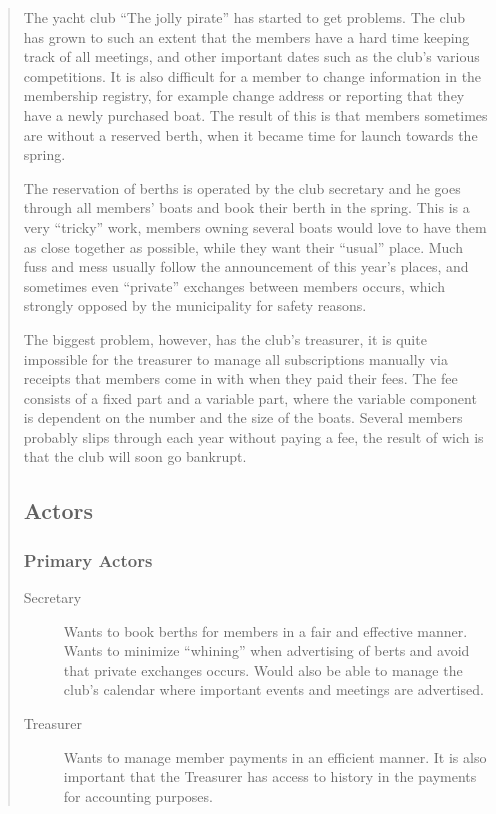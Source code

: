 \begin{quote}
The yacht club ``The jolly pirate'' has started to get problems. The club has
grown to such an extent that the members have a hard time keeping track of all
meetings, and other important dates such as the club's various competitions. It
is also difficult for a member to change information in the membership
registry, for example change address or reporting that they have a newly
purchased boat. The result of this is that members sometimes are without a
reserved berth, when it became time for launch towards the spring.

The reservation of berths is operated by the club secretary and he goes through
all members’ boats and book their berth in the spring. This is a very ``tricky''
work, members owning several boats would love to have them as close together as
possible, while they want their ``usual'' place. Much fuss and mess usually
follow the announcement of this year’s places, and sometimes even ``private''
exchanges between members occurs, which strongly opposed by the municipality
for safety reasons.

The biggest problem, however, has the club’s treasurer, it is quite impossible
for the treasurer to manage all subscriptions manually via receipts that
members come in with when they paid their fees. The fee consists of a fixed
part and a variable part, where the variable component is dependent on the
number and the size of the boats. Several members probably slips through each
year without paying a fee, the result of wich is that the club will soon go
bankrupt.


\subsection{Actors}
\subsubsection{Primary Actors}
\begin{description}
  \item[Secretary]
  Wants to book berths for members in a fair and effective manner. Wants to
  minimize ``whining'' when advertising of berts and avoid that private
  exchanges occurs. Would also be able to manage the club’s calendar where
  important events and meetings are advertised.
  
  \item[Treasurer]
  Wants to manage member payments in an efficient manner. It is also important
  that the Treasurer has access to history in the payments for accounting
  purposes.


\end{description}
\end{quote}
